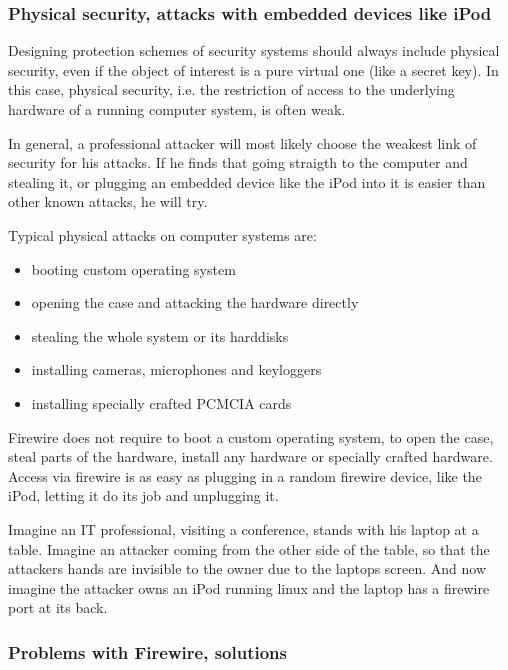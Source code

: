 \subsubsection{Physical security, attacks with embedded devices like iPod}

Designing protection schemes of security systems should always include physical
security, even if the object of interest is a pure virtual one (like a secret
key). In this case, physical security, i.e. the restriction of access to the
underlying hardware of a running computer system, is often weak.

In general, a professional attacker will most likely choose the weakest link of
security for his attacks. If he finds that going straigth to the computer and
stealing it, or plugging an embedded device like the iPod into it is easier than
other known attacks, he will try.

Typical physical attacks on computer systems are:

\begin{itemize}
	\item booting custom operating system
	\item opening the case and attacking the hardware directly
	\item stealing the whole system or its harddisks \item installing
	cameras, microphones and keyloggers \item installing specially crafted
	PCMCIA cards \end{itemize}

Firewire does not require to boot a custom operating system, to open the case,
steal parts of the hardware, install any hardware or specially crafted hardware.
Access via firewire is as easy as plugging in a random firewire device, like the
iPod, letting it do its job and unplugging it.

Imagine an IT professional, visiting a conference, stands with his laptop at a
table.  Imagine an attacker coming from the other side of the table, so that the
attackers hands are invisible to the owner due to the laptops screen. And now
imagine the attacker owns an iPod running linux and the laptop has a firewire
port at its back.



\subsubsection{Problems with Firewire, solutions}

